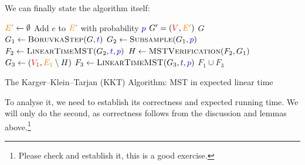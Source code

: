 \noindent We can finally state the algorithm itself:
\begin{algorithm}[htbp!]
\begin{algorithmic}[1]
    \State $\textcolor{orange}{E'} \gets \emptyset$
     
        \State Add $e$ to $\textcolor{orange}{E'}$ with probability $\textcolor{blue}{p}$
    \EndFor
    \State\Return $G'=(\textcolor{red}{V}, \textcolor{orange}{E'})$
\EndProcedure
{}
        \Return $G$ 
    \EndIf
    \State $G_1 \gets \textsc{BoruvkaStep}(G,\textcolor{blue}{t})$ \label{step:kkt:boruvska}
    \State $G_2 \gets \textsc{Subsample}(G_1,\textcolor{blue}{p})$ \label{step:kkt:subsampling}
    \State $F_2 \gets \textsc{LinearTimeMST}(G_2,\textcolor{blue}{t},\textcolor{blue}{p})$ 
    \State $H\gets \textsc{MSTVerification}(F_2, G_1)$  \label{step:kkt:verification}
    \State $G_3 \gets (\textcolor{red}{V_1}, \textcolor{orange}{E_1}\setminus H)$  \label{step:kkt:pruning}
    \State $F_3 \gets \textsc{LinearTimeMST}(G_3,\textcolor{blue}{t},\textcolor{blue}{p})$ 
    \State\Return $F_1\cup F_3$
\EndProcedure
\end{algorithmic}
\caption{The Karger--Klein--Tarjan (KKT) Algorithm: MST in expected linear time}
\label{alg:kkt:algorithm}
\end{algorithm}
To analyse it, we need to establish its correctness and expected running time. We will only do the second, as correctness follows from the discussion and lemmas above.\footnote{Please check and establish it, this is a good exercise.}

